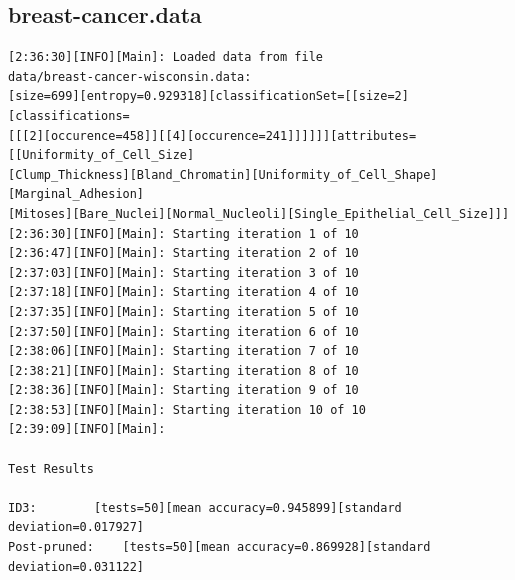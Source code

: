 \documentclass[10pt]{report}
\begin{document}
\subsection*{breast-cancer.data}
{\small
\begin{verbatim}
[2:36:30][INFO][Main]: Loaded data from file
data/breast-cancer-wisconsin.data:
[size=699][entropy=0.929318][classificationSet=[[size=2][classifications=
[[[2][occurence=458]][[4][occurence=241]]]]]][attributes=[[Uniformity_of_Cell_Size]
[Clump_Thickness][Bland_Chromatin][Uniformity_of_Cell_Shape][Marginal_Adhesion]
[Mitoses][Bare_Nuclei][Normal_Nucleoli][Single_Epithelial_Cell_Size]]] 
[2:36:30][INFO][Main]: Starting iteration 1 of 10 
[2:36:47][INFO][Main]: Starting iteration 2 of 10 
[2:37:03][INFO][Main]: Starting iteration 3 of 10  
[2:37:18][INFO][Main]: Starting iteration 4 of 10 
[2:37:35][INFO][Main]: Starting iteration 5 of 10 
[2:37:50][INFO][Main]: Starting iteration 6 of 10 
[2:38:06][INFO][Main]: Starting iteration 7 of 10  
[2:38:21][INFO][Main]: Starting iteration 8 of 10 
[2:38:36][INFO][Main]: Starting iteration 9 of 10 
[2:38:53][INFO][Main]: Starting iteration 10 of 10 
[2:39:09][INFO][Main]: 

Test Results

ID3:		[tests=50][mean accuracy=0.945899][standard deviation=0.017927]
Post-pruned:	[tests=50][mean accuracy=0.869928][standard deviation=0.031122] 

\end{verbatim}
}


\renewcommand{\bibname}{References}



\end{document}
